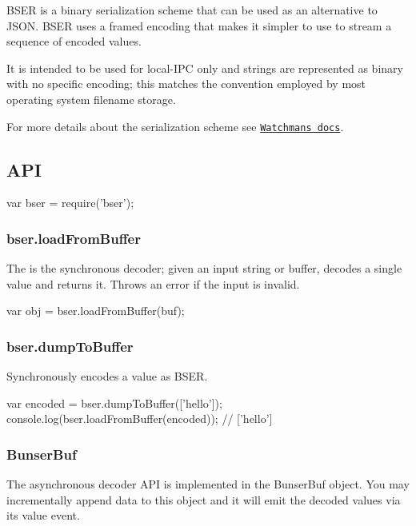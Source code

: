 B\+S\+ER is a binary serialization scheme that can be used as an alternative to J\+S\+ON. B\+S\+ER uses a framed encoding that makes it simpler to use to stream a sequence of encoded values.

It is intended to be used for local-\/\+I\+PC only and strings are represented as binary with no specific encoding; this matches the convention employed by most operating system filename storage.

For more details about the serialization scheme see \href{https://facebook.github.io/watchman/docs/bser.html}{\tt Watchman\textquotesingle{}s docs}.

\subsection*{A\+PI}


\begin{DoxyCode}
var bser = require('bser');
\end{DoxyCode}


\subsubsection*{bser.\+load\+From\+Buffer}

The is the synchronous decoder; given an input string or buffer, decodes a single value and returns it. Throws an error if the input is invalid.


\begin{DoxyCode}
var obj = bser.loadFromBuffer(buf);
\end{DoxyCode}


\subsubsection*{bser.\+dump\+To\+Buffer}

Synchronously encodes a value as B\+S\+ER.


\begin{DoxyCode}
var encoded = bser.dumpToBuffer(['hello']);
console.log(bser.loadFromBuffer(encoded)); // ['hello']
\end{DoxyCode}


\subsubsection*{Bunser\+Buf}

The asynchronous decoder A\+PI is implemented in the Bunser\+Buf object. You may incrementally append data to this object and it will emit the decoded values via its {\ttfamily value} event.


